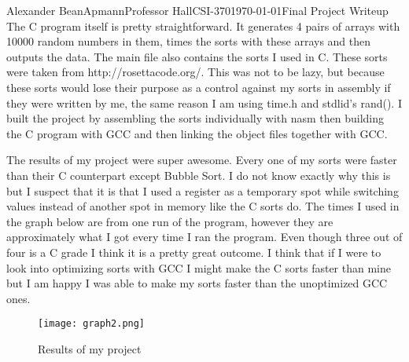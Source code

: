 \documentclass[11pt,letterpaper]{article}
\begin{document}
\begin{mla}{Alexander Bean}{Apmann}{Professor Hall}{CSI-370}{\today}{Final Project Writeup}
The C program itself is pretty straightforward. It generates 4 pairs of arrays with 10000 random numbers in them, times the sorts with these arrays and then outputs the data. The main file also contains the sorts I used in C. These sorts were taken from http://rosettacode.org/. This was not to be lazy, but because these sorts would lose their purpose as a control against my sorts in assembly if they were written by me, the same reason I am using time.h and stdlid's rand(). I built the project by assembling the sorts individually with nasm then building the C program with GCC and then linking the object files together with GCC.

The results of my project were super awesome. Every one of my sorts were faster than their C counterpart except Bubble Sort. I do not know exactly why this is but I suspect that it is that I used a register as a temporary spot while switching values instead of another spot in memory like the C sorts do. The times I used in the graph below are from one run of the program, however they are approximately what I got every time I ran the program. Even though three out of four is a C grade I think it is a pretty great outcome. I think that if I were to look into optimizing sorts with GCC I might make the C sorts faster than mine but I am happy I was able to make my sorts faster than the unoptimized GCC ones.

\begin{figure}[h!]
	\caption{Results of my project}
	\centering
		\texttt{[image: graph2.png]}
\end{figure}


\end{mla}
\end{document}
